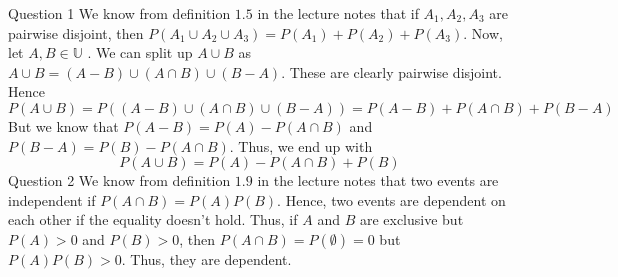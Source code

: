 \documentclass[12pt]{exam}
\begin{document}
\begin{questions}
\question Question 1\newline
We know from definition $1.5$ in the lecture notes that if $A_1, A_2, A_3$ are pairwise disjoint, then $P(A_1 \cup A_2 \cup A_3) = P(A_1)+P(A_2)+P(A_3)$. Now, let $A,B \in \mathbb{U}$ . We can split up $A\cup B$ as $A\cup B = (A-B) \cup (A \cap B) \cup (B-A)$. These are clearly pairwise disjoint. Hence \[P(A\cup B) = P((A-B) \cup (A \cap B) \cup (B-A)) = P(A-B) + P(A \cap B) + P(B-A)\] But we know that $P(A-B) = P(A) - P(A \cap B)$ and $P(B-A) = P(B) - P(A \cap B)$. Thus, we end up with \[P(A\cup B) = P(A) - P(A \cap B) + P(B)\]
\question  Question 2\newline
We know from definition $1.9$ in the lecture notes that two events are independent if $P(A\cap B) = P(A)P(B)$. Hence, two events are dependent on each other if the equality doesn't hold. Thus, if $A$ and $B$ are exclusive but $P(A) > 0$ and $P(B) > 0$, then $P(A\cap B) = P(\emptyset) = 0$ but $P(A)P(B) > 0$. Thus, they are dependent. 
\end{questions}
\end{document}

